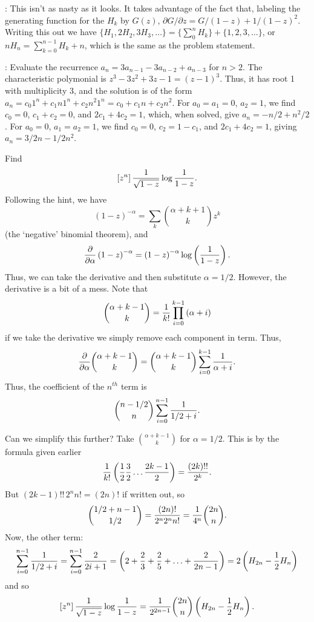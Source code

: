 : This isn't as nasty as it looks.  It takes
advantage of the fact that, labeling the generating function for
the $H_k$ by $G\left(z\right)$, $\partial G / \partial z = G / \left(1 - z\right) + 1 / \left(1 - z\right)^2$.
Writing this out we have $\{ H_1, 2 H_2, 3 H_3, \ldots \} = \{ \sum_0^n H_k \} + \{1, 2, 3, \ldots \}$,
or $n H_n = \sum_{k=0}^{n-1} H_k + n$, which is the same as the problem statement.

: Evaluate the
recurrence $a_n = 3 a_{n-1} - 3 a_{n-2} + a_{n-3}$ for $n > 2$.\hfil\break
The characteristic polymonial is $z^3 - 3 z^2 + 3 z - 1 = \left(z - 1\right)^3$.
Thus, it has root 1 with multiplicity 3, and the solution is of the form
$a_n = c_0 1^n + c_1 n 1^n + c_2 n^2 1^n = c_0 + c_1 n + c_2 n^2$.
For $a_0 = a_1 = 0$, $a_2 = 1$, we find $c_0 = 0$, $c_1 + c_2 = 0$,
and $2 c_1 + 4 c_2 = 1$, which, when solved, give $a_n = -n / 2 + n^2/2$.
For $a_0 = 0$, $a_1 = a_2 = 1$, we find $c_0 = 0$, $c_2 = 1 - c_1$,
and $2 c_1 + 4 c_2 = 1$, giving $a_n = 3/2 n - 1/2 n^2$.

 Find
$$
 \left[z^n\right] {1 \over \sqrt{1 - z}} \log {1 \over 1 - z}.
$$
Following the hint, we
have
$$
 \left(1 - z\right)^{-\alpha} = \sum_k {\alpha + k + 1 \choose k} z^k
$$
(the `negative' binomial theorem), and
$$
 {\partial \over \partial \alpha} \left(1 - z \right)^{-\alpha}
  = \left(1 - z\right)^{-\alpha} \log \left({1 \over 1 - z}\right).
$$
Thus, we can take the derivative and then substitute $\alpha = 1/2$.
However, the derivative is a bit of a mess.  Note that
$$
  {\alpha + k - 1 \choose k} = {1 \over k!} \prod_{i=0}^{k-1} \left(\alpha + i\right)
$$
if we take the derivative we simply remove each component in term.  Thus,
$$
 {\partial \over \partial \alpha} {\alpha + k - 1 \choose k} =
  {\alpha + k - 1 \choose k} \sum_{i=0}^{k-1} {1 \over \alpha + i}.
$$
Thus, the coefficient of the $n^{th}$ term is
$$
 {n - 1/2 \choose n} \sum_{i=0}^{n-1} {1 \over 1/2 + i}.
$$

Can we simplify this further?  Take $\alpha + k - 1 \choose k$ for $\alpha = 1/2$.
This is by the formula given earlier 
$$
 {1 \over k!} \left({1 \over 2} {3 \over 2} \ldots {2k - 1 \over 2}\right) =
  {\left(2k\right)!! \over 2^k}.
$$
But $\left(2k - 1\right)!! \, 2^n n! = \left(2 n\right)!$ if written out,
so
$$
 {1/2 + n - 1 \choose 1/2} = {\left(2 n\right)! \over 2^n 2^n n!} = {1 \over 4^n} {2n \choose n}.
$$
Now, the other term:
$$
 \sum_{i=0}^{n-1} {1 \over 1/2 + i} = \sum_{i=0}^{n-1} {2 \over 2 i + 1}
  = \left(2 + {2 \over 3} + {2 \over 5} + \ldots + {2 \over 2 n - 1}\right)
  = 2 \left(H_{2n} - {1 \over 2} H_n\right)
$$
and so
$$
 \left[z^n\right] {1 \over \sqrt{1 - z}} \log {1 \over 1 - z} =
  {1 \over 2^{2n-1}} {2n \choose n} \left(H_{2n} - {1 \over 2} H_n\right).
$$

